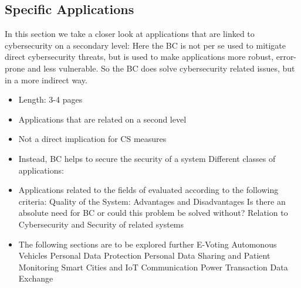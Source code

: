 \subsection{Specific Applications}

In this section we take a closer look at applications that are linked to cybersecurity on a secondary level: Here the BC is not per se used to mitigate direct cybersecurity threats, but is used to make applications more robust, error-prone and less vulnerable. So the BC does solve cybersecurity related issues, but in a more indirect way.
\begin{itemize}
\item Length: 3-4 pages
\item Applications that are related on a second level
\item Not a direct implication for CS measures
\item Instead, BC helps to secure the security of a system
Different classes of applications:
\item Applications related to the fields of evaluated according to the following criteria:
\subitem Quality of the System: Advantages and Disadvantages
\subitem Is there an absolute need for BC or could this problem be solved without?
\subitem Relation to Cybersecurity and Security of related systems
\item The following sections are to be explored further
\subitem E-Voting \cite{Osgood2016} \cite{BenAyed2017a}
\subitem Automonous Vehicles \cite{Dorri2017} \cite{Rowan2017a}
\subitem Personal Data Protection \cite{Zyskind2015a}
\subitem Personal Data Sharing and Patient Monitoring \cite{Yue2016a}
\subitem Smart Cities and IoT \cite{Biswas2016a}
\subitem Communication \cite{Rowan2017a}
\subitem Power Transaction
\subitem Data Exchange

\end{itemize}
